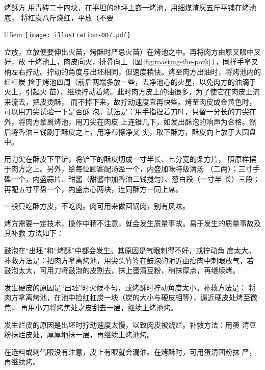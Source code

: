 \begin{recipe}{烤酥方}
\step[烤酥] 用青砖二十四块，在平坦的地坪上嵌一烤池，用细煤渣灰五斤平铺在烤池底，
将杠炭八斤烧红，平放（不要
\begin{wrapfigure}[13]{l}{15em}%
\centering%
\vspace{-.5\baselineskip}%
\texttt{[image: illustration-007.pdf]}%
\vspace{.1875\baselineskip}%
\caption{烤酥}
\label{fig:roasting-the-pork}
\end{wrapfigure}
%
立放，立放便要伸出火苗，烤酥时严忌火苗）在烤池之中。再将肉方由原叉眼中叉好，放
于烤池上，肉皮向火，排骨向上（图\,\ref{fig:roasting-the-pork}\,），同样手拿叉
柄左右拧动。拧动的角度与出坯相同，但速度稍快。烤至肉方出油时，将烤池内的红杠炭
捡于烤池四周（前后两端多放一些，去净池心的火星，以免肉方的油滴于火上，引起火
苗），继续拧动着烤。此时肉方皮上的油很多，为了使它在肉皮上流来流去，把皮烫酥，
而不掉下来，故拧动速度宜再快些。烤至肉皮成金黄色时，可以用刀尖试验一下是否酥
泡。试法是：用手指捏着刀叶，只留一分长的刀尖在外，将肉方拿离烤池，用刀尖在肉皮
上连锥几下，如发出酥泡的响声为合格。然后将香油三钱刷于酥皮之上，用净布擦净叉
尖，取下酥方，酥皮向上放于大圆盘中。

\step[铲皮上席] 用刀尖在酥皮下平铲，将铲下的酥皮切成一寸半长、七分宽的条方片，
照原样摆于肉方之上。另外，给每位顾客配汤盃一个，内盛加味特级清汤\footnotemark
（二两）；三寸手碟一个，内盛蒜片、甜酱（甜酱中加香油二钱搅匀）、葱白段（一寸半
长）三段；再配五寸平盘一个，内盛点心两块，连同酥方一同上席。

\step[吃法] 一般只吃酥方皮，不吃肉。肉可用来做回锅肉，别有风味。

\suggestion

烤方需要一定技术，操作中稍不注意，就会发生质量事故。易于发生的质量事故及其补救
方法如下：

\hint[方皮鼓泡] 鼓泡在“出坯”和“烤酥”中都会发生。其原因是气眼刺得不好，或拧动角
度太大。补救方法是：把肉方拿离烤池，用尖头竹签在鼓泡的附近由痩肉中刺眼放气，若
鼓泡太大，可用刀将鼓泡的皮割去，抹上蛋清豆粉，稍抹厚点，再继续烤。

\hint[硬皮] 发生硬皮的原因是“出坯”时火候不匀，或烤酥时拧动角度太小。补救方法是：
将肉方拿离烤池，在池中捡红杠炭一块（炭的大小与硬皮相等），逼近硬皮处烤至微焦，
再用小刀将烤焦处之皮刮去一层，继续上烤池烤。

\hint[烂皮] 发生烂皮的原因是出坯时拧动速度太慢，以致肉皮被烧烂。补救方法：用蛋
清豆粉抹烂皮处，厚厚地抹一层，再继续上烤池烤。

\hint[漏油] 在选料或刺气眼没有注意，皮上有眼就会漏油。在烤酥时，可用蛋清团粉抹
严，再继续烤。


\end{recipe}
